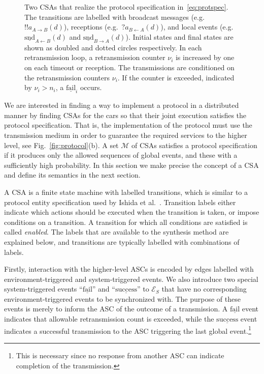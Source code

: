 \documentclass{sig-alternate}
\newcommand{\M}{\mathcal{M}}
\newcommand{\SE}{\mathcal{E}_S}
\newcommand{\locev}[1]{\underline{#1}}
\newcommand{\success}{\locev{\mathrm{success}}}
\newcommand{\fail}{\locev{\mathrm{fail}}}
\newcommand{\snd}{\mathrm{snd}}
\newcommand{\env}[4]{\locev{#1}_{{#2} \rightarrow {#3}}(#4)}
\newcommand{\sys}[4]{\locev{#1}_{{#2} \leftarrow {#3}}(#4)}
\newcommand{\define}{\sl}
\newcommand{\fig}[1]{Fig.\ \ref{fig:#1}}
\newcommand{\figvspace}{\vspace{-0.2in}}
\begin{document}
\begin{figure}[hbt!]
\figvspace
\caption{Two CSAs that realize the protocol specification in~\eqref{eq:protspec}. The transitions are labelled with broadcast messages (e.g.\ $!!a_{A \rightarrow B}(d)$), receptions (e.g.\ $?a_{B \leftarrow A}(d)$), and local events (e.g.\ $\sys{\snd}{A}{B}{d}$ and $\env{\snd}{B}{A}{d}$). Initial states and final states are shown as doubled and dotted circles respectively. In each retransmission loop, a retransmission counter $\nu_i$ is increased by one on each timeout or reception. The transmissions are conditioned on the retransmission counters $\nu_i$. If the counter is exceeded, indicated by $\nu_i > n_i$, a $\fail_i$ occurs.}
\label{fig:services}
\figvspace
\end{figure}

We are interested in finding a way to implement a protocol in a distributed manner by finding CSAs for the cars so that their joint execution satisfies the protocol specification. That is, the implementation of the protocol must use the transmission medium in order to guarantee the required services to the higher level, see \fig{protocol}(b). A set $\M$ of CSAs satisfies a protocol specification if it produces only the allowed sequences of global events, and these with a sufficiently high probability. In this section we make precise the concept of a CSA and define its semantics in the next section.

A CSA is a finite state machine with labelled transitions, which is similar to a protocol entity specification used by Ishida et al.\ \cite{Ishida}. Transition labels either indicate which actions should be executed when the transition is taken, or impose conditions on a transition. A transition for which all conditions are satisfied is called {\define enabled}. The labels that are available to the synthesis method are explained below, and transitions are typically labelled with combinations of labels.

Firstly, interaction with the higher-level ASCs is encoded by edges labelled with environment-triggered and system-triggered events. We also introduce two special system-triggered events ``$\fail$'' and ``$\success$'' to $\SE$ that have no corresponding environment-triggered events to be synchronized with. The purpose of these events is merely to inform the ASC of the outcome of a transmission. A $\fail$ event indicates that allowable retransmission count is exceeded, while the $\success$ event indicates a successful transmission to the ASC triggering the last global event.\footnote{This is necessary since no response from another ASC can indicate completion of the transmission.}
\end{document}
